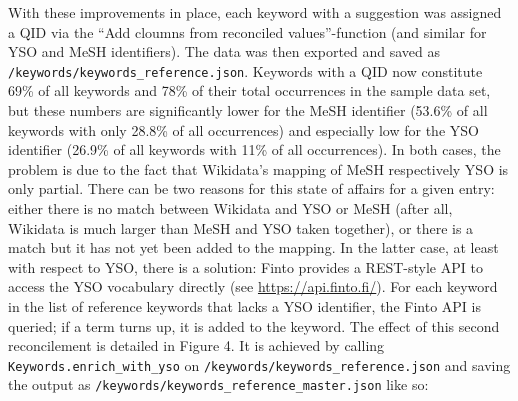 With these improvements in place, each keyword with a suggestion was
assigned a QID via the ``Add cloumns from reconciled values''-function
(and similar for YSO and MeSH identifiers). The data was then exported
and saved as \texttt{/keywords/keywords\_reference.json}. Keywords with
a QID now constitute 69\% of all keywords and 78\% of their total
occurrences in the sample data set, but these numbers are significantly
lower for the MeSH identifier (53.6\% of all keywords with only 28.8\%
of all occurrences) and especially low for the YSO identifier (26.9\% of
all keywords with 11\% of all occurrences). In both cases, the problem
is due to the fact that Wikidata's mapping of MeSH respectively YSO is
only partial. There can be two reasons for this state of affairs for a
given entry: either there is no match between Wikidata and YSO or MeSH
(after all, Wikidata is much larger than MeSH and YSO taken together),
or there is a match but it has not yet been added to the mapping. In the
latter case, at least with respect to YSO, there is a solution: Finto
provides a REST-style API to access the YSO vocabulary directly (see
\url{https://api.finto.fi/}). For each keyword in the list of reference
keywords that lacks a YSO identifier, the Finto API is queried; if a
term turns up, it is added to the keyword. The effect of this second
reconcilement is detailed in Figure 4. It is achieved by calling
\texttt{Keywords.enrich\_with\_yso} on
\texttt{/keywords/keywords\_reference.json} and saving the output as
\texttt{/keywords/keywords\_reference\_master.json} like so:

\begin{Shaded}
\begin{Highlighting}[]
\OperatorTok{=}\NormalTok{)}
\OperatorTok{=}
\NormalTok{)}
\end{Highlighting}
\end{Shaded}

